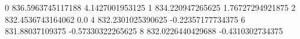 0 836.5963745117188 4.1427001953125
1 834.220947265625 1.76727294921875
2 832.4536743164062 0.0
4 832.2301025390625 -0.22357177734375
6 831.88037109375 -0.57330322265625
8 832.0226440429688 -0.4310302734375
